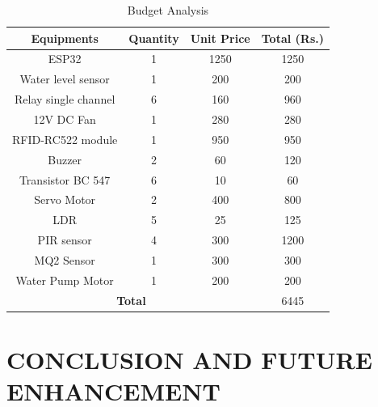 \documentclass[12pt,a4paper]{report}
\begin{document}
	\begin{center}
		
		\begin{table}[h]
			
			\centering
				
			\caption{Budget Analysis}
			\vspace{7 px}
			\renewcommand{\arraystretch}{2}
			\setlength{\arrayrulewidth}{1.5pt} %
			\begin{tabular}{|c|c|c|c|}
			\hline
			\textbf{Equipments} &	\textbf{Quantity} & 	\textbf{Unit Price}& 	\textbf{Total (Rs.) }\\
			\hline
			ESP32 & 1 & 1250 & 1250 \\
			\hline
			Water level sensor & 1 & 200 & 200 \\
			\hline
			Relay single channel & 6 & 160 & 960 \\
			\hline
			12V DC Fan & 1 & 280 & 280 \\
			\hline
			RFID-RC522 module & 1 & 950 & 950 \\
			\hline
			Buzzer & 2 & 60 & 120 \\
			\hline
			Transistor BC 547 & 6 & 10 & 60\\
			\hline
			Servo Motor& 2 & 400 & 800 \\
			\hline
			LDR & 5 & 25 & 125\\
			\hline
			PIR sensor & 4& 300& 1200\\
			\hline
			MQ2 Sensor&1 & 300&300 \\
			\hline
			Water Pump Motor & 1 & 200 & 200\\
			\hline
			\multicolumn{3}{|c|}{ \textbf{Total} } & 6445 \\
			\hline
			
			
		\end{tabular}
		
			
			
			
			
			
			
		\end{table}
		
		
		
		
		
		
		
		
	\end{center}
	
	

	
	
	\chapter{CONCLUSION AND FUTURE ENHANCEMENT}
	
\end{document}
